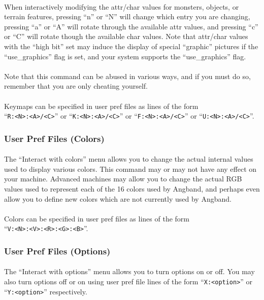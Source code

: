 \paragraph{}When interactively modifying the attr/char values for
monsters, objects, or terrain features, pressing ``n'' or ``N'' will
change which entry you are changing, pressing ``a'' or ``A'' will rotate
through the available attr values, and pressing ``c'' or ``C'' will rotate
though the available char values. Note that attr/char values with the
``high bit'' set may induce the display of special ``graphic'' pictures if
the ``use\_graphics'' flag is set, and your system supports the
``use\_graphics'' flag.

\paragraph{}Note that this command can be abused in various ways, and if
you must do so, remember that you are only cheating yourself.

\paragraph{}Keymaps can be specified in user pref files as lines of the
form\\
``\verb+R:<N>:<A>/<C>+'' or ``\verb+K:<N>:<A>/<C>+'' or
``\verb+F:<N>:<A>/<C>+'' or ``\verb+U:<N>:<A>/<C>+''.

\subsubsection{User Pref Files (Colors)}
\paragraph{}The ``Interact with colors'' menu allows you to change the actual
internal values used to display various colors. This command may or may
not have any effect on your machine. Advanced machines may allow you to
change the actual RGB values used to represent each of the 16 colors used
by Angband, and perhaps even allow you to define new colors which are not
currently used by Angband.

\paragraph{}Colors can be specified in user pref files as lines of the
form\\
``\verb+V:<N>:<V>:<R>:<G>:<B>+''.

\subsubsection{User Pref Files (Options)}
\paragraph{}The ``Interact with options'' menu allows you to turn options
on or off. You may also turn options off or on using user pref file lines
of the form ``\verb+X:<option>+'' or ``\verb+Y:<option>+'' respectively.

